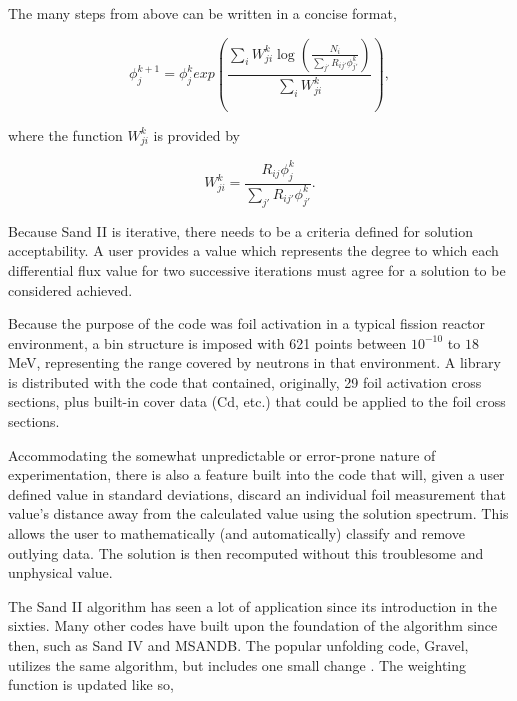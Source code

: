 The many steps from above can be written in a concise format,

\begin{equation}
\label{eqn:sandii}
\phi_j^{k + 1} = \phi_j^{k} exp(\frac{\sum_i W_{ji}^k \log(\frac{N_i}{\sum_{j'} R_{ij'} \phi_{j'}^k})}{\sum_i W_{ji}^k}) ,
\end{equation}

\noindent
where the function $W_{ji}^k$ is provided by

\begin{equation}
\label{eqn:sandii-w}
W_{ji}^k = \frac{R_{ij} \phi_{j}^k}{\sum_{j'} R_{ij'} \phi_{j'}^k} .
\end{equation}

Because Sand II is iterative, there needs to be a criteria defined for solution acceptability.
A user provides a value which represents the degree to which each differential flux value for two successive iterations must agree for a solution to be considered achieved.

Because the purpose of the code was foil activation in a typical fission reactor environment, a bin structure is imposed with 621 points between $10^{-10}$ to $18$ MeV, representing the range covered by neutrons in that environment.
A library is distributed with the code that contained, originally, 29 foil activation cross sections, plus built-in cover data (Cd, etc.) that could be applied to the foil cross sections.

Accommodating the somewhat unpredictable or error-prone nature of experimentation, there is also a feature built into the code that will, given a user defined value in standard deviations, discard an individual foil measurement that value's distance away from the calculated value using the solution spectrum.
This allows the user to mathematically (and automatically) classify and remove outlying data.
The solution is then recomputed without this troublesome and unphysical value.

The Sand II algorithm has seen a lot of application since its introduction in the sixties.
Many other codes have built upon the foundation of the algorithm since then, such as Sand IV and MSANDB.
The popular unfolding code, Gravel, utilizes the same algorithm, but includes one small change \cite{reginatto2004umg}.
The weighting function is updated like so,

